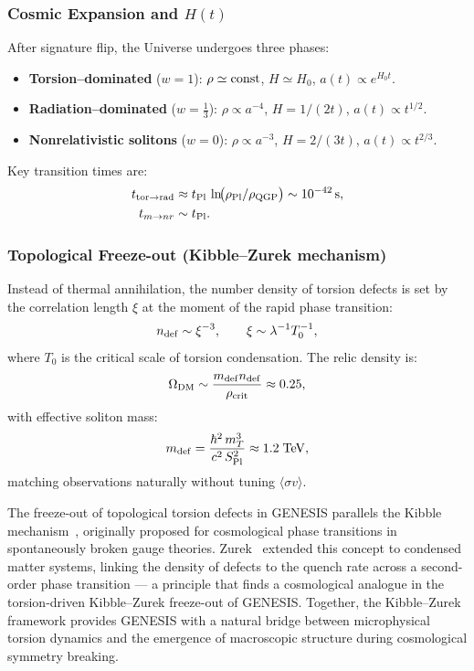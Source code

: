 \documentclass{article}
\newcommand{\Splanck}{S_{\mathrm{Pl}}}
\begin{document}
\subsubsection{Cosmic Expansion and \(H(t)\)}
After signature flip, the Universe undergoes three phases:
\begin{itemize}
  \item {\bf Torsion–dominated} (\(w=1\)): 
    \(\rho\simeq\rm const\), \(H\simeq H_0\), \(a(t)\propto e^{H_0t}\).
  \item {\bf Radiation–dominated} (\(w=\tfrac13\)): 
    \(\rho\propto a^{-4}\), \(H=1/(2t)\), \(a(t)\propto t^{1/2}\).
  \item {\bf Nonrelativistic solitons} (\(w=0\)): 
    \(\rho\propto a^{-3}\), \(H=2/(3t)\), \(a(t)\propto t^{2/3}\).
\end{itemize}
Key transition times are:
\begin{align*}
  t_{\rm tor\to rad}
    &\approx t_{\rm Pl}\,\ln\!\bigl(\rho_{\rm Pl}/\rho_{\rm QGP}\bigr)
     \sim10^{-42}\,\mathrm s,\\
  t_{m\to nr}
    &\sim t_{\rm Pl}.
\end{align*}

\subsubsection{Topological Freeze-out (Kibble–Zurek mechanism)}
Instead of thermal annihilation, the number density of torsion defects is set by the correlation length $\xi$ at the moment of the rapid phase transition:
\begin{equation}
  n_{\rm def} \sim \xi^{-3},
  \qquad
  \xi \sim \lambda^{-1} T_0^{-1},
\end{equation}
where $T_0$ is the critical scale of torsion condensation. The relic density is:
\begin{equation}
  \Omega_{\rm DM} \sim \frac{m_{\rm def} n_{\rm def}}{\rho_{\rm crit}}
  \approx 0.25,
\end{equation}
with effective soliton mass:
\begin{equation}
  m_{\rm def} = \frac{\hbar^2\,m_T^3}{c^2\,\Splanck^2}
  \approx 1.2\;\mathrm{TeV},
\end{equation}
matching observations naturally without tuning $\langle\sigma v\rangle$.

The freeze-out of topological torsion defects in GENESIS parallels the Kibble mechanism~\cite{kibble1976}, originally proposed for cosmological phase transitions in spontaneously broken gauge theories.
Zurek~\cite{zurek1985} extended this concept to condensed matter systems, linking the density of defects to the quench rate across a second-order phase transition — a principle that finds a cosmological analogue in the torsion-driven Kibble–Zurek freeze-out of GENESIS.
Together, the Kibble–Zurek framework provides GENESIS with a natural bridge between microphysical torsion dynamics and the emergence of macroscopic structure during cosmological symmetry breaking.
\end{document}
